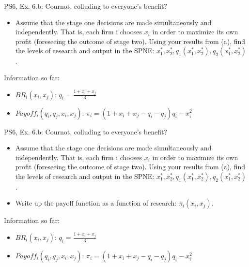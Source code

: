 \begin{frame}{PS6, Ex. 6.b: Cournot, colluding to everyone's benefit?}
    \begin{itemize}
    \item[(b)] Assume that the stage one decisions are made simultaneously and independently. That is, each firm i chooses $x_i$ in order to maximize its own profit (foreseeing the outcome of stage two). Using your results from (a), find the levels of research and output in the SPNE: $x_1^*,x_2^*,q_1(x_1^*,x_2^*),q_2(x_1^*,x_2^*)$.
    \end{itemize}
  \begin{multicols}{2}
    \vfill\null \columnbreak
    Information so far:
    \begin{itemize}
    \item[1] $BR_i(x_i,x_j)$: $q_i = \frac{1+x_i+x_j}{3}$
    \item[2] $Payoff_i(q_i,q_j,x_i,x_j)$: $\pi_i=(1+x_i+x_j-q_i-q_j)q_i-x_i^2$
    \end{itemize}
    \vfill\null
  \end{multicols}
\end{frame}
\begin{frame}{PS6, Ex. 6.b: Cournot, colluding to everyone's benefit?}
    \begin{itemize}
    \item[(b)] Assume that the stage one decisions are made simultaneously and independently. That is, each firm i chooses $x_i$ in order to maximize its own profit (foreseeing the outcome of stage two). Using your results from (a), find the levels of research and output in the SPNE: $x_1^*,x_2^*,q_1(x_1^*,x_2^*),q_2(x_1^*,x_2^*)$.
    \end{itemize}
  \begin{multicols}{2}
    \begin{itemize}
      \item[(Step 1)] Write up the payoff function as a function of research: $\pi_i(x_i,x_j)$.
    \end{itemize}
    \vfill\null \columnbreak
    Information so far:
    \begin{itemize}
    \item[1] $BR_i(x_i,x_j)$: $q_i = \frac{1+x_i+x_j}{3}$
    \item[2] $Payoff_i(q_i,q_j,x_i,x_j)$: $\pi_i=(1+x_i+x_j-q_i-q_j)q_i-x_i^2$
    \end{itemize}
    \vfill\null
  \end{multicols}
\end{frame}
